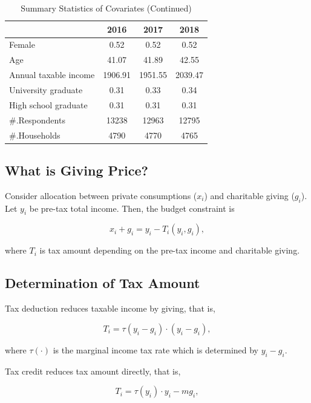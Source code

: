 \documentclass[ review  , 3p ]{elsarticle}
\begin{document}
  \begin{table}
  
  \caption{\label{tab:kableSummaryCovariate2}Summary Statistics of Covariates (Continued)}
  \centering
  \begin{tabular}[t]{lccc}
  \toprule
   & 2016 & 2017 & 2018\\
  \midrule
  Female & 0.52 & 0.52 & 0.52\\
  Age & 41.07 & 41.89 & 42.55\\
  Annual taxable income & 1906.91 & 1951.55 & 2039.47\\
  University graduate & 0.31 & 0.33 & 0.34\\
  High school graduate & 0.31 & 0.31 & 0.31\\
  \#.Respondents & 13238 & 12963 & 12795\\
  \#.Households & 4790 & 4770 & 4765\\
  \bottomrule
  \end{tabular}
  \end{table}
  
  \hypertarget{what-is-giving-price}{%
  \subsection{What is Giving Price?}\label{what-is-giving-price}}
  
  Consider allocation between private consumptions (\(x_i\)) and charitable giving (\(g_i\)).
  Let \(y_i\) be pre-tax total income.
  Then, the budget constraint is
  
  \[
      x_i + g_i = y_i - T_i(y_i, g_i),
  \]
  
  where \(T_i\) is tax amount depending on the pre-tax income and charitable giving.
  
  \hypertarget{determination-of-tax-amount}{%
  \subsection{Determination of Tax Amount}\label{determination-of-tax-amount}}
  
  Tax deduction reduces taxable income by giving, that is,
  
  \[
      T_i = \tau(y_i - g_i) \cdot (y_i - g_i),
  \]
  
  where \(\tau(\cdot)\) is the marginal income tax rate which is determined by \(y_i - g_i\).
  
  Tax credit reduces tax amount directly, that is,
  
  \[
      T_i = \tau(y_i)\cdot y_i - m g_i,
  \]
  
\end{document}
